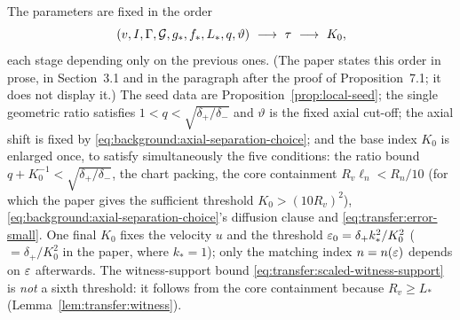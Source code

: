 \begin{definition}
  \label{def:transfer:parameter-choice}
  \leanok
  The parameters are fixed in the order
  \[
    (v,I,\Gamma,\cG,g_*,f_*,L_*,q,\vartheta)\ \longrightarrow\ \tau
    \ \longrightarrow\ K_0 ,
  \]
  each stage depending only on the previous ones.  (The paper states this order in prose,
  in Section~3.1 and in the paragraph after the proof of Proposition~7.1; it does not display
  it.)  The seed
  data are Proposition~\ref{prop:local-seed}; the single geometric ratio satisfies
  $1<q<\sqrt{\delta_+/\delta_-}$ and $\vartheta$ is the fixed axial cut-off; the axial shift
  is fixed by \eqref{eq:background:axial-separation-choice}; and the base index $K_0$ is
  enlarged once, to satisfy simultaneously the five conditions: the ratio bound
  $q+K_0^{-1}<\sqrt{\delta_+/\delta_-}$, the chart packing, the core containment
  $R_v\ell_n<R_n/10$ (for which the paper gives the sufficient threshold
  $K_0>(10R_v)^2$), \eqref{eq:background:axial-separation-choice}'s diffusion clause and
  \eqref{eq:transfer:error-small}.  One final $K_0$ fixes the velocity $u$ and the threshold
  $\varepsilon_0=\delta_+k_*^2/K_0^2$ ($=\delta_+/K_0^2$ in the paper, where $k_*=1$); only the matching index $n=n(\varepsilon)$ depends on $\varepsilon$
  afterwards.  The witness-support bound \eqref{eq:transfer:scaled-witness-support} is
  \emph{not} a sixth threshold: it follows from the core containment because $R_v\geq L_*$
  (Lemma~\ref{lem:transfer:witness}).
\end{definition}

